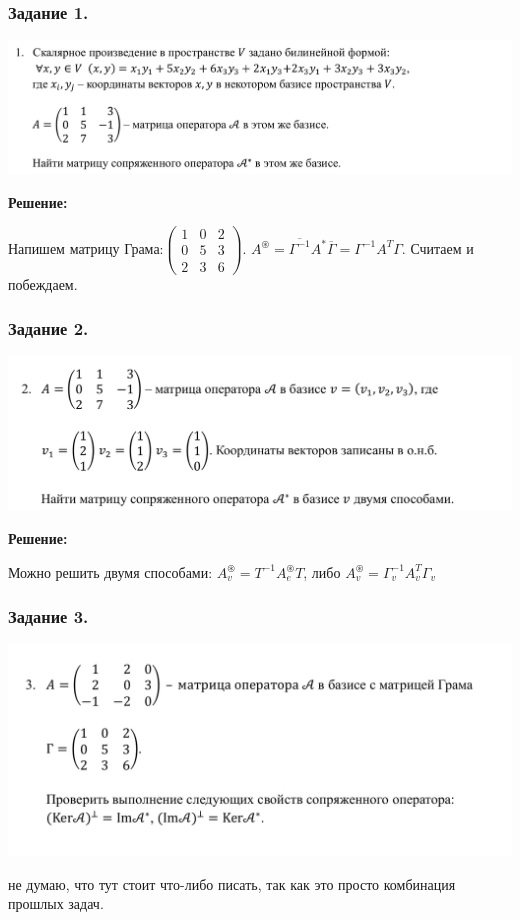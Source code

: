 \subsubsection{Задание 1.}

\begin{center}
   \includegraphics{assets/practice-6-task-1.png}
\end{center}
\textbf{Решение:}

Напишем матрицу Грама:$\begin{pmatrix}
    1 & 0 & 2 \\
    0 & 5 & 3 \\
    2 & 3 & 6
\end{pmatrix}$. $A^\circledast = \overline{\Gamma^{-1}}A^* \overline{\Gamma} = \Gamma^{-1}A^T \Gamma$. Считаем и побеждаем.

\subsubsection{Задание 2.}

\begin{center}
   \includegraphics{assets/practice-6-task-2.png}
\end{center}

\textbf{Решение:}

Можно решить двумя способами: $A^\circledast_v = T^{-1}A_e^\circledast T$, либо $A^\circledast_v = \Gamma_v^{-1}A_v^T \Gamma_v$

\subsubsection{Задание 3.}

\begin{center}
   \includegraphics[width = 15 cm]{assets/practice-6-task-3.png}
\end{center}

не думаю, что тут стоит что-либо писать, так как это просто комбинация прошлых задач.
